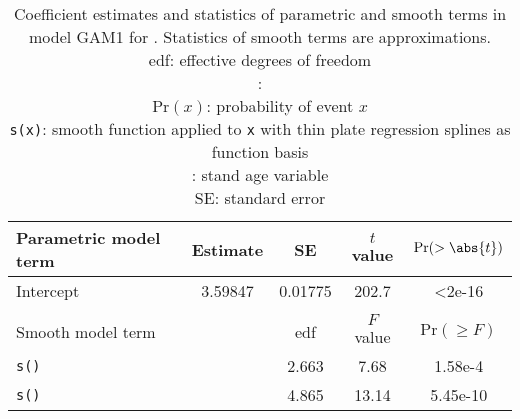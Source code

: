 \begin{singlespace}
  \begin{table}[h]
    \caption{Coefficient estimates and statistics of parametric and smooth terms in model GAM1 for \Beech{}.  Statistics of smooth terms are approximations. \\
      edf: effective degrees of freedom \\
      \texttt{\ProductivityIndexVariableR{}}: \ProductivityIndexVariableText{} \\
      \(\text{Pr}(x)\): probability of event \(x\) \\
      \texttt{s(x)}: smooth function applied to \texttt{x} with thin plate regression splines as function basis \\
      \texttt{\StandAgeVariableR{}}: stand age variable \\
      SE: standard error}
    \label{tab:StatisticsGAM1Beech}
    {\tabulinesep=2mm
      \begin{tabu}{L
          S[table-format = 1.5]
          S[table-format = 1.5]
          S[table-format = 3.2]
          S[table-format = 1.2e-2, table-comparator = true]
        }
        \toprule
        Parametric model term & {Estimate} & {SE} & {\(t\) value} & {\(\text{Pr}(> \abs{t})\)} \\
        \midrule
        Intercept & 3.59847 & 0.01775 & 202.7 & <2e-16 \\
        \\
        Smooth model term &  & {edf} & {\(F\) value} & {\(\text{Pr}(\geq F)\)} \\
        \midrule
        \texttt{s(\StandAgeVariableR{})} & & 2.663 & 7.68 & 1.58e-4 \\
        \texttt{s(\ProductivityIndexVariableR{})} & & 4.865 & 13.14 & 5.45e-10 \\
        \bottomrule
      \end{tabu}
    }
  \end{table}
\end{singlespace}

